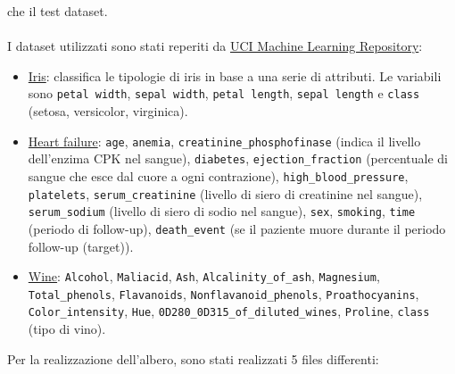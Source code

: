 \documentclass{article}
\begin{document}
che il test dataset.\\
\\
I dataset utilizzati sono stati reperiti da \href{https://archive.ics.uci.edu/}{UCI Machine Learning Repository}:
\begin{itemize}
	\item \href{https://archive.ics.uci.edu/dataset/53/iris}{Iris}: classifica le tipologie di iris in base a una serie di attributi. Le variabili sono \texttt{petal width}, \texttt{sepal width}, \texttt{petal length}, \texttt{sepal length} e \texttt{class} (setosa, versicolor, virginica).
	\item \href{https://archive.ics.uci.edu/dataset/519/heart+failure+clinical+records}{Heart failure}: \texttt{age}, \texttt{anemia}, \texttt{creatinine\_phosphofinase} (indica il livello dell'enzima CPK nel sangue), \texttt{diabetes}, \texttt{ejection\_fraction} (percentuale di sangue che esce dal cuore a ogni contrazione), \texttt{high\_blood\_pressure}, \texttt{platelets}, \texttt{serum\_creatinine} (livello di siero di creatinine nel sangue), \texttt{serum\_sodium} (livello di siero di sodio nel sangue), \texttt{sex}, \texttt{smoking}, \texttt{time} (periodo di follow-up), \texttt{death\_event} (se il paziente muore durante il periodo follow-up (target)).
	\item \href{https://archive.ics.uci.edu/dataset/109/wine}{Wine}: \texttt{Alcohol}, \texttt{Maliacid}, \texttt{Ash}, \texttt{Alcalinity\_of\_ash}, \texttt{Magnesium}, \texttt{Total\_phenols}, \texttt{Flavanoids}, \texttt{Nonflavanoid\_phenols}, \texttt{Proathocyanins}, \texttt{Color\_intensity}, \texttt{Hue}, \texttt{0D280\_0D315\_of\_diluted\_wines}, \texttt{Proline}, \texttt{class} (tipo di vino).
\end{itemize}
Per la realizzazione dell'albero, sono stati realizzati 5 files differenti:
\end{document}
